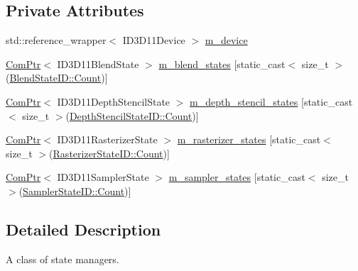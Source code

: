 \subsection*{Private Attributes}
\begin{DoxyCompactItemize}
\item 
std\+::reference\+\_\+wrapper$<$ I\+D3\+D11\+Device $>$ \mbox{\hyperlink{classmage_1_1rendering_1_1_state_manager_abfe78953d7404fc86e85531ac296281b}{m\+\_\+device}}
\item 
\mbox{\hyperlink{namespacemage_ae74f374780900893caa5555d1031fd79}{Com\+Ptr}}$<$ I\+D3\+D11\+Blend\+State $>$ \mbox{\hyperlink{classmage_1_1rendering_1_1_state_manager_ad72e83edb0b28b1f03cf8a7dc231587e}{m\+\_\+blend\+\_\+states}} \mbox{[}static\+\_\+cast$<$ size\+\_\+t $>$(\mbox{\hyperlink{namespacemage_1_1rendering_abdf11cdb816b9208aec6c3a81f7564abae93f994f01c537c4e2f7d8528c3eb5e9}{Blend\+State\+I\+D\+::\+Count}})\mbox{]}
\item 
\mbox{\hyperlink{namespacemage_ae74f374780900893caa5555d1031fd79}{Com\+Ptr}}$<$ I\+D3\+D11\+Depth\+Stencil\+State $>$ \mbox{\hyperlink{classmage_1_1rendering_1_1_state_manager_af5deff162f3f1d102091749bfbe205b6}{m\+\_\+depth\+\_\+stencil\+\_\+states}} \mbox{[}static\+\_\+cast$<$ size\+\_\+t $>$(\mbox{\hyperlink{namespacemage_1_1rendering_ace195e7a068336e477080fce30f1329eae93f994f01c537c4e2f7d8528c3eb5e9}{Depth\+Stencil\+State\+I\+D\+::\+Count}})\mbox{]}
\item 
\mbox{\hyperlink{namespacemage_ae74f374780900893caa5555d1031fd79}{Com\+Ptr}}$<$ I\+D3\+D11\+Rasterizer\+State $>$ \mbox{\hyperlink{classmage_1_1rendering_1_1_state_manager_a2d97d987062db0bf6d2f91c77ecb0655}{m\+\_\+rasterizer\+\_\+states}} \mbox{[}static\+\_\+cast$<$ size\+\_\+t $>$(\mbox{\hyperlink{namespacemage_1_1rendering_ac878731f5dc22a3a36ccfbfc77c3facaae93f994f01c537c4e2f7d8528c3eb5e9}{Rasterizer\+State\+I\+D\+::\+Count}})\mbox{]}
\item 
\mbox{\hyperlink{namespacemage_ae74f374780900893caa5555d1031fd79}{Com\+Ptr}}$<$ I\+D3\+D11\+Sampler\+State $>$ \mbox{\hyperlink{classmage_1_1rendering_1_1_state_manager_ac0d76e363936a196acc6fafa09acc73d}{m\+\_\+sampler\+\_\+states}} \mbox{[}static\+\_\+cast$<$ size\+\_\+t $>$(\mbox{\hyperlink{namespacemage_1_1rendering_a6f80181126db61dbb8b528a6894eb658ae93f994f01c537c4e2f7d8528c3eb5e9}{Sampler\+State\+I\+D\+::\+Count}})\mbox{]}
\end{DoxyCompactItemize}


\subsection{Detailed Description}
A class of state managers. 

